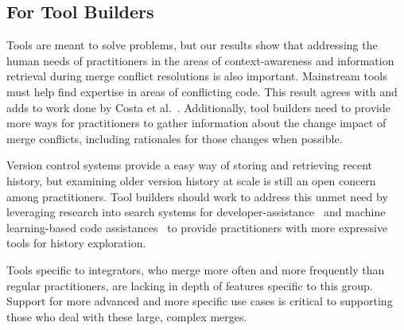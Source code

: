 \subsection{For Tool Builders}
Tools are meant to solve problems, but our results show that addressing the human needs of  practitioners in the areas of context-awareness and information retrieval during merge conflict resolutions is also important.
Mainstream tools must help find expertise in areas of conflicting code.
This result agrees with and adds to work done by Costa et al.~\cite{CostaSarma}.
Additionally, tool builders need to provide more ways for practitioners to gather information about the change impact of merge conflicts, including rationales for those changes when possible.

Version control systems provide a easy way of storing and retrieving recent history, but examining older version history at scale is still an open concern among practitioners.
Tool builders should work to address this unmet need by leveraging research into search systems for developer-assistance~\cite{nabi2016putting} and machine learning-based code assistances~\cite{bradley2011history_exploration} to provide practitioners with more expressive tools for history exploration.

Tools specific to integrators, who merge more often and more frequently than regular practitioners, are lacking in depth of features specific to this group.
Support for more advanced and more specific use cases is critical to supporting those who deal with these large, complex merges.